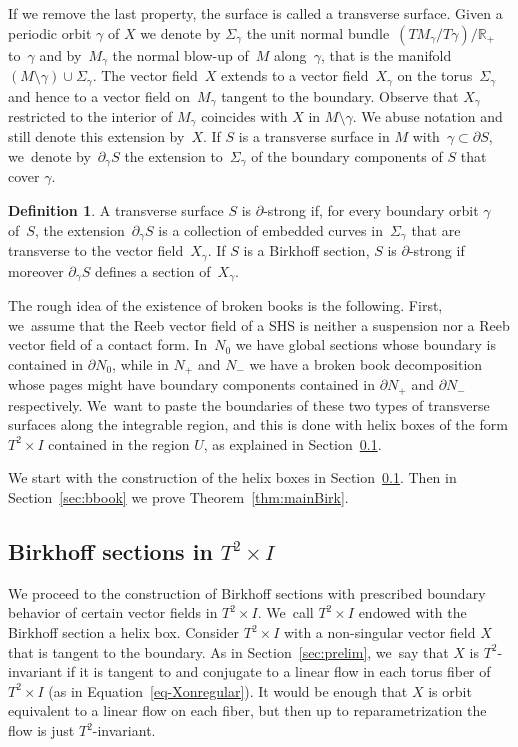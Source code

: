 \documentclass[JEP,XML,SOM,Unicode,NoEqCountersInSection,NoFloatCountersInSection,published]{cedram}
\theoremstyle{definition}
\newtheorem{defi}[theorem]{Definition}
\newcommand\R{\mathbb{R}}
\begin{document}
If we remove the last property, the surface is called a transverse surface. Given a periodic orbit $\gamma$ of $X$ we denote by $\Sigma_\gamma$ the unit normal bundle~$(TM_\gamma/T\gamma)/\R_+$ to~$\gamma$ and by~$M_\gamma$ the normal blow-up of~$M$ along~$\gamma$, that is the manifold~$(M\setminus\gamma)\cup \Sigma_\gamma$.
The vector field~$X$ extends to a vector field~$X_\gamma$ on the torus~$\Sigma_\gamma$ and hence to a vector field on~$M_\gamma$ tangent to the boundary. Observe that $X_\gamma$ restricted to the interior of $M_\gamma$ coincides with $X$ in $M\setminus \gamma$.
We abuse notation and still denote this extension by~$X$.
If $S$ is a transverse surface in $M$ with~$\gamma \subset \partial S$, we~denote by~$\partial_\gamma S$ the extension to~$\Sigma_\gamma$ of the boundary components of $S$ that cover $\gamma$.

\begin{defi}\label{defn-strong}
A transverse surface $S$ is $\partial$-strong if, for every boundary orbit $\gamma$ of~$S$, the extension~$\partial_\gamma S$ is a collection of embedded curves in~$\Sigma_\gamma$ that are transverse to the vector field~$X_\gamma$.
If $S$ is a Birkhoff section, $S$ is $\partial$-strong if moreover $\partial_\gamma S$ defines a section of~$X_\gamma$.
\end{defi}

The rough idea of the existence of broken books is the following. First, we~assume that the Reeb vector field of a SHS is neither a suspension nor a Reeb vector field of a contact form. In~$N_0$ we have global sections whose boundary is contained in $\partial N_0$, while in $N_+$ and $N_-$ we have a broken book decomposition whose pages might have boundary components contained in $\partial N_+$ and $\partial N_-$ respectively. We~want to paste the boundaries of these two types of transverse surfaces along the integrable region, and this is done with helix boxes of the form $T^2\times I$ contained in the region $U$, as explained in Section~\ref{sec:gluing}.

We start with the construction of the helix boxes
in Section~\ref{sec:gluing}. Then in Section~\ref{sec:bbook} we prove Theorem~\ref{thm:mainBirk}.

\subsection{Birkhoff sections in $T^2\times I$}\label{sec:gluing}

We proceed to the construction of Birkhoff sections with prescribed boundary behavior of certain vector fields in $T^2\times I$. We~call $T^2\times I$ endowed with the Birkhoff section a helix box. Consider $T^2\times I$ with a non-singular vector field $X$ that is tangent to the boundary. As in Section~\ref{sec:prelim}, we~say that $X$ is $T^2$-invariant if it is tangent to and conjugate to a linear flow in each torus fiber of $T^2\times I$ (as in Equation~\eqref{eq-Xonregular}). It would be enough that $X$ is orbit equivalent to a linear flow on each fiber, but then up to reparametrization the flow is just $T^2$-invariant.
\end{document}
